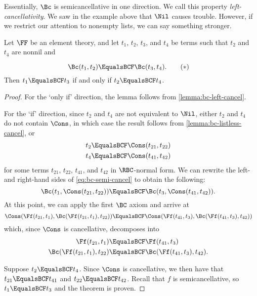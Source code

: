 Essentially, $\Bc$ is semicancellative in one direction. We call this property
\emph{left-cancel\-lativity}. We saw in the example above that $\Nil$ causes
trouble. However, if we restrict our attention to nonempty lists, we can say
something stronger.

\begin{Theorem}\label{thm:bc-semi-cancel}
    Let $\FF$ be an element theory, and let $t_1$, $t_2$, $t_3$, and $t_4$ be
    terms such that $t_2$ and $t_4$ are nonnil and
    \addtocounter{equation}{1}
    \begin{equation}\label{eq:bc-semi-cancel}
        \Bc(t_1, t_2) \EqualsBCF \Bc(t_3, t_4). \tag{$\ast$}
    \end{equation}
    Then $t_1 \EqualsBCF t_3$ if and only if $t_2 \EqualsBCF t_4$.
\end{Theorem}

\begin{proof}
    For the `only if' direction, the lemma follows from
    \cref{lemma:bc-left-cancel}.

    For the `if' direction, since $t_2$ and $t_4$ are not equivalent to $\Nil$,
    either $t_2$ and $t_4$ do not contain $\Cons$, in which case the result
    follows from \cref{lemma:bc-listless-cancel}, or
    \begin{align*}
        t_2 &\EqualsBCF \Cons(t_{21}, t_{22}) \\
        t_4 &\EqualsBCF \Cons(t_{41}, t_{42})
    \end{align*}
    for some terms $t_{21}$, $t_{22}$, $t_{41}$, and $t_{42}$ in $\RBC$-normal
    form. We can rewrite the left- and right-hand sides of
    \cref{eq:bc-semi-cancel} to obtain the following:
    \[\Bc(t_1, \Cons(t_{21}, t_{22})) \EqualsBCF \Bc(t_3, \Cons(t_{41}, t_{42})).\]
    At this point, we can apply the first $\BC$ axiom and arrive at
    \[\Cons(\Ff(t_{21}, t_1), \Bc(\Ff(t_{21}, t_1), t_{22})) \EqualsBCF
    \Cons(\Ff(t_{41}, t_3), \Bc(\Ff(t_{41}, t_3), t_{42}))\]
    which, since $\Cons$ is cancellative, decomposes into
    \begin{align*}
        \Ff(t_{21}, t_1) &\EqualsBCF \Ff(t_{41}, t_3) \\
        \Bc(\Ff(t_{21}, t_1), t_{22}) &\EqualsBCF \Bc(\Ff(t_{41}, t_3), t_{42}).
    \end{align*}

    Suppose $t_2 \EqualsBCF t_4$. Since $\Cons$ is cancellative, we then have
    that $t_{21} \EqualsBCF t_{41}$ and $t_{22} \EqualsBCF t_{42}$. Recall that
    $f$ is semicancellative, so $t_1 \EqualsBCF t_3$ and the theorem is proven.
\end{proof}

